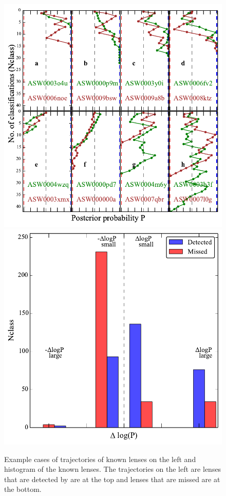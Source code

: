 \documentclass[useAMS,usenatbib,a4paper]{mn2e}
\begin{document}
\begin{figure}
\begin{center}
\includegraphics[scale=0.6]{sw-cfhtls-figs/det_mis_traj.pdf}
\includegraphics[scale=0.6]{sw-cfhtls-figs/det_mis_hist.pdf}
\caption{ \label{fig:detmis}
Example cases of trajectories of known lenses on the left and histogram
of the known lenses. The trajectories on the left are lenses that are
detected by \sw are at the top and lenses that are missed are at the bottom. }
\end{center}
\end{figure}
\end{document}

